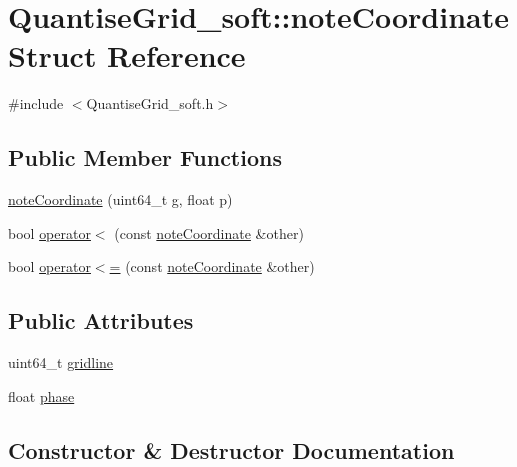 \hypertarget{structQuantiseGrid__soft_1_1noteCoordinate}{}\section{Quantise\+Grid\+\_\+soft\+:\+:note\+Coordinate Struct Reference}
\label{structQuantiseGrid__soft_1_1noteCoordinate}


{\ttfamily \#include $<$Quantise\+Grid\+\_\+soft.\+h$>$}

\subsection*{Public Member Functions}
\begin{DoxyCompactItemize}
\item 
\mbox{\hyperlink{structQuantiseGrid__soft_1_1noteCoordinate_a9ddd787e2a395a1d6243af0aecf48ff2}{note\+Coordinate}} (uint64\+\_\+t g, float p)
\item 
bool \mbox{\hyperlink{structQuantiseGrid__soft_1_1noteCoordinate_ac3edd1bb18b7294d6601f4f39d8fe913}{operator$<$}} (const \mbox{\hyperlink{structQuantiseGrid__soft_1_1noteCoordinate}{note\+Coordinate}} \&other)
\item 
bool \mbox{\hyperlink{structQuantiseGrid__soft_1_1noteCoordinate_a92b1eedbffb4215add5e127c18e8de24}{operator$<$=}} (const \mbox{\hyperlink{structQuantiseGrid__soft_1_1noteCoordinate}{note\+Coordinate}} \&other)
\end{DoxyCompactItemize}
\subsection*{Public Attributes}
\begin{DoxyCompactItemize}
\item 
uint64\+\_\+t \mbox{\hyperlink{structQuantiseGrid__soft_1_1noteCoordinate_a21b822d390f01aba9aa1fed2d5cc8a08}{gridline}}
\item 
float \mbox{\hyperlink{structQuantiseGrid__soft_1_1noteCoordinate_aee66a62adac6ba5afdd8a20fa28bf2be}{phase}}
\end{DoxyCompactItemize}


\subsection{Constructor \& Destructor Documentation}
\mbox{\label{structQuantiseGrid__soft_1_1noteCoordinate_a9ddd787e2a395a1d6243af0aecf48ff2}} 
